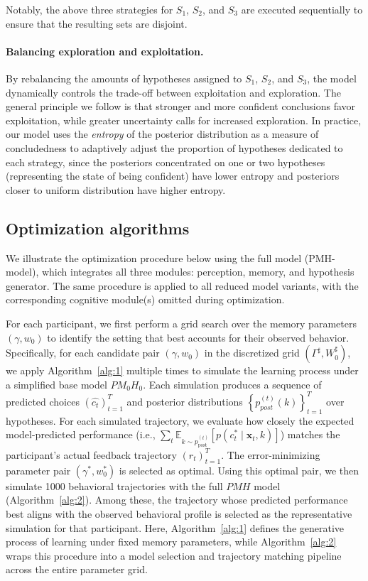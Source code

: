Notably, the above three strategies for $S_1$, $S_2$, and $S_3$ are executed sequentially to ensure that the resulting sets are disjoint.

\paragraph{Balancing exploration and exploitation.}
By rebalancing the amounts of hypotheses assigned to $S_1$, $S_2$, and $S_3$, the model dynamically controls the trade-off between exploitation and exploration. The general principle we follow is that stronger and more confident conclusions favor exploitation, while greater uncertainty calls for increased exploration. In practice, our model uses the \textit{entropy} of the posterior distribution as a measure of concludedness to adaptively adjust the proportion of hypotheses dedicated to each strategy, since the posteriors concentrated on one or two hypotheses (representing the state of being confident) have lower entropy and posteriors closer to uniform distribution have higher entropy.

\subsection{Optimization algorithms}

We illustrate the optimization procedure below using the full model (PMH-model), which integrates all three modules: perception, memory, and hypothesis generator. The same procedure is applied to all reduced model variants, with the corresponding cognitive module(s) omitted during optimization.

For each participant, we first perform a grid search over the memory parameters $(\gamma, w_0)$ to identify the setting that best accounts for their observed behavior. Specifically, for each candidate pair $(\gamma, w_0)$ in the discretized grid $(\Gamma^\sharp, W_0^\sharp)$, we apply Algorithm~\ref{alg:1} multiple times to simulate the learning process under a simplified base model $PM_0H_0$. Each simulation produces a sequence of predicted choices ${(\hat{c_t})_{t=1}^T}$ and posterior distributions $\left\{p_{post}^{(t)}(k)\right\}_{t=1}^T$ over hypotheses. For each simulated trajectory, we evaluate how closely the expected model-predicted performance (i.e., $\sum_t \mathbb{E}_{k\sim p_{\text{post}}^{(t)}}[p(c_t^\ast \mid \mathbf{x}_t, k)]$) matches the participant’s actual feedback trajectory $(r_t)_{t=1}^T$. The error-minimizing parameter pair $(\gamma^\ast, w_0^\ast)$ is selected as optimal. Using this optimal pair, we then simulate 1000 behavioral trajectories with the full $PMH$ model (Algorithm~\ref{alg:2}). Among these, the trajectory whose predicted performance best aligns with the observed behavioral profile is selected as the representative simulation for that participant. Here, Algorithm~\ref{alg:1} defines the generative process of learning under fixed memory parameters, while Algorithm~\ref{alg:2} wraps this procedure into a model selection and trajectory matching pipeline across the entire parameter grid.

